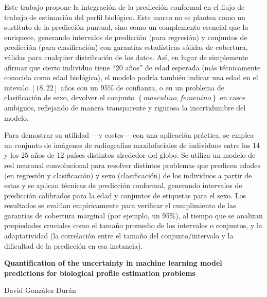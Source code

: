 Este trabajo propone la integración de la predicción conformal en el flujo de trabajo de estimación del perfil biológico. Este marco no se plantea como un sustituto de la predicción puntual, sino como un complemento esencial que la enriquece, generando intervalos de predicción (para regresión) y conjuntos de predicción (para clasificación) con garantías estadísticas sólidas de cobertura, válidas para cualquier distribución de los datos. Así, en lugar de simplemente afirmar que cierto individuo tiene ``20 años'' de edad esperada (más técnicamente conocida como edad biológica), el modelo podría también indicar una edad en el intevalo $[18, 22]$ años con un 95\% de confianza, o en un problema de clasificación de sexo, devolver el conjunto $\left\{masculino, femenino\right\}$ en casos ambiguos, reflejando de manera transparente y rigurosa la incertidumbre del modelo.

Para demostrar su utilidad ---y costes--- con una aplicación práctica, se emplea un conjunto de imágenes de radiografías maxilofaciales de individuos entre los 14 y los 25 años de 12 países distintos alrededor del globo. Se utiliza un modelo de red neuronal convolucional para resolver distintos problemas que predicen edades (en regresión y clasificación) y sexo (clasificación) de los individuos a partir de estas y se aplican técnicas de predicción conformal, generando intervalos de predicción calibrados para la edad y conjuntos de etiquetas para el sexo. Los resultados se evalúan empíricamente para verificar el cumplimiento de las garantías de cobertura marginal (por ejemplo, un 95\%), al tiempo que se analizan propiedades cruciales como el tamaño promedio de los intervalos o conjuntos, y la adaptatividad (la correlación entre el tamaño del conjunto/intervalo y la dificultad de la predicción en esa instancia). 


\cleardoublepage
\thispagestyle{empty}

\begin{center}
    {\large\bfseries Quantification of the uncertainty in machine learning model predictions for biological profile estimation problems}
\end{center}
\begin{center}
    David González Durán 
\end{center}

\vspace{0.7cm}

